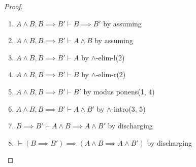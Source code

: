\begin{proof}
\begin{enumerate}
\item $A\land B,B\implies B'\vdash B\implies B'$ by assuming%
\item $A\land B,B\implies B'\vdash A\land B$ by assuming%
\item $A\land B,B\implies B'\vdash A$ by $\land$-elim-l(2)%
\item $A\land B,B\implies B'\vdash B$ by $\land$-elim-r(2)%
\item $A\land B,B\implies B'\vdash B'$ by modus ponens(1, 4)%
\item $A\land B,B\implies B'\vdash A\land B'$ by $\land$-intro(3, 5)%
\item $B\implies B'\vdash A\land B \implies A\land B'$ by discharging%
\item $\vdash(B\implies B')\implies(A\land B \implies A\land B')$ by discharging
\qedhere
\end{enumerate}
\end{proof}

